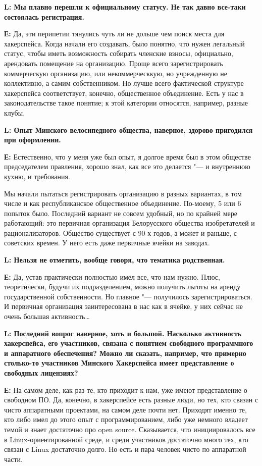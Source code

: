 \documentclass[10pt, a5paper]{article}
\begin{document}
{\noindent \bf L: Мы плавно перешли к официальному статусу. Не так давно все-таки состоялась регистрация.}

{\noindent \bf Е:} Да, эти перипетии тянулись чуть ли не дольше чем поиск места для хакерспейса. Когда начали его создавать, было понятно, что нужен легальный статус, чтобы иметь возможность собирать членские взносы, официально, арендовать помещение на организацию. Проще всего зарегистрировать коммерческую организацию, или некоммерческкую, но учрежденную не коллективно, а самим собственником. Но лучше всего фактической структуре хакерспейса соответствует, конечно, общественное объединение. Есть у нас в законодательстве такое понятие; к этой категории относятся, например, разные клубы.

{\noindent \bf L: Опыт Минского велосипедного общества, наверное, здорово пригодился при оформлении.}

{\noindent \bf Е:} Естественно, что у меня уже был опыт, я долгое время был в этом обществе председателем правления, хорошо знал, как все это делается "--- и внутреннюю кухню, и требования.

Мы начали пытаться регистрировать организацию в разных вариантах, в том числе и как республиканское общественное объединение. По-моему, 5 или 6 попыток было. Последний вариант не совсем удобный, но по крайней мере работающий: это первичная организация Белорусского общества изобретателей и рационализаторов. Общество существует с 90-х годов, а может и раньше, с советских времен. У него есть даже первичные ячейки на заводах. 

{\noindent \bf L: Нельзя не отметить, вообще говоря, что тематика родственная.}

{\noindent \bf Е:} Да, устав практически полностью имел все, что нам нужно. Плюс, теоретически, будучи их  подразделением, можно получить льготы на аренду государственной собственности. Но главное "--- получилось зарегистрироваться. И первичная организация заинтересована в нас как в ячейке, у них сейчас не очень большая активность\ldots
 
{\noindent \bf L: Последний вопрос наверное, хоть и большой. Насколько активность хакерспейса, его участников, связана с понятием свободного программного и аппаратного обеспечения? Можно ли сказать, например, что примерно столько-то участников Минского Хакерспейса имеет представление о свободных лицензиях?}

{\noindent \bf Е:} На самом деле, как раз те, кто приходит к нам, уже имеют представление о свободном ПО. Да, конечно, в хакерспейсе есть разные люди, но тех, кто связан с чисто аппаратными проектами, на самом деле почти нет. Приходят именно те, кто либо имел до этого опыт с программированием, либо уже немного владеет темой и знает достаточно про open source. Сказывается, что инициировалось все в Linux-ориентированной среде, и среди участников достаточно много тех, кто связан с Linux достаточно долго. Но есть и пара человек чисто по аппаратной части.
\end{document}
